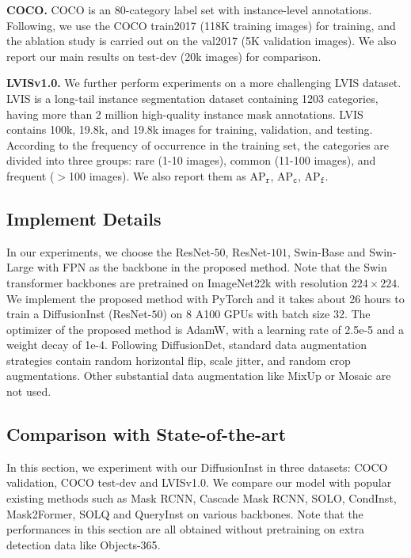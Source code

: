 \documentclass{article}
\begin{document}
\noindent
\textbf{COCO.} COCO is an 80-category label set with instance-level annotations. Following\cite{PointRend}, we use the COCO train2017 (118K training images) for training, and the ablation study is carried out on the val2017 (5K validation images). We also report our main results on test-dev (20k images) for comparison.

\noindent
\textbf{LVISv1.0.} We further perform experiments on a more challenging LVIS dataset\cite{LVIS}. LVIS is a long-tail instance segmentation dataset containing 1203 categories, having more than 2 million high-quality instance mask annotations. LVIS contains 100k, 19.8k, and 19.8k images for training, validation, and testing. According to the frequency of occurrence in the training set, the categories are divided into three groups: rare (1-10 images), common (11-100 images), and frequent ($>$100 images). We also report them as AP$_{\mathtt{r}}$, AP$_{\mathtt{c}}$, AP$_{\mathtt{f}}$.



\subsection{Implement Details}

In our experiments, we choose the ResNet-$50$\cite{ResNet}, ResNet-$101$, Swin-Base\cite{swin} and Swin-Large with FPN\cite{FPN} as the backbone in the proposed method. Note that the Swin transformer backbones are pretrained on ImageNet22k with resolution $224\times 224$. We implement the proposed method with PyTorch\cite{pytorch} and it takes about 26 hours to train a DiffusionInst (ResNet-$50$) on 8 A100 GPUs with batch size 32. The optimizer of the proposed method is AdamW\cite{loshchilov2017decoupled}, with a learning rate of 2.5e-5 and a weight decay of 1e-4. Following DiffusionDet, standard data augmentation strategies contain random horizontal flip, scale jitter, and random crop augmentations. Other substantial data augmentation like MixUp\cite{zhang2017mixup} or Mosaic\cite{ge2021yolox} are not used.


\subsection{Comparison with State-of-the-art}

In this section, we experiment with our DiffusionInst in three datasets: COCO validation, COCO test-dev and LVISv1.0. We compare our model with popular existing methods such as Mask RCNN, Cascade Mask RCNN, SOLO, CondInst, Mask2Former, SOLQ and QueryInst on various backbones. Note that the performances in this section are all obtained without pretraining on extra detection data like Objects-365\cite{2020Objects365}.
\end{document}
